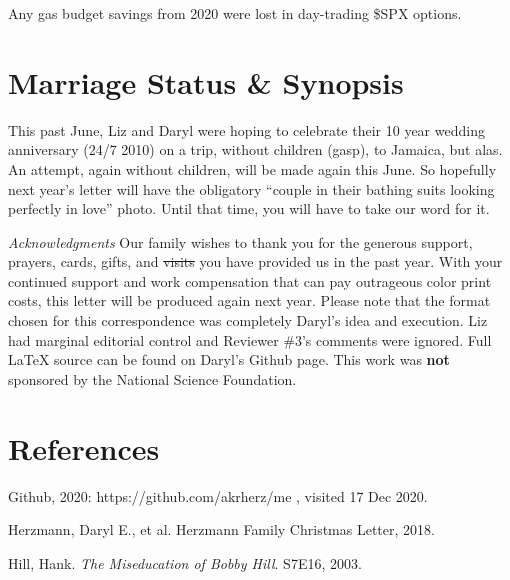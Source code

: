 \documentclass[letterpaper,11pt]{article}
\makeatletter
\def\refer{\par\noindent\hangindent\parindent\hangafter1}
\newenvironment{figurehere}
  {\def\@captype{figure}}
  {}
\makeatother
\begin{document}
\begin{multicols}{2}
\begin{figurehere}
    \centering   
    \caption{Any gas budget savings from 2020 were lost in day-trading \$SPX
    options.}
\end{figurehere}

\section{Marriage Status \& Synopsis}

This past June, Liz and Daryl were hoping
to celebrate their 10 year wedding anniversary (24/7 2010) on a trip,
without children (gasp), to Jamaica, but alas.  An attempt, again without
children, will be made again this June.  So hopefully next year's letter will have the
obligatory \enquote{couple in their bathing suits looking perfectly in love} photo.
Until that time, you will have to take our word for it.

\bigskip

\emph{Acknowledgments} Our family wishes to thank you for the generous 
support, prayers, cards, gifts, and \sout{visits} you have provided us in the past
year. With your continued support and work compensation that can pay outrageous 
color print costs, this letter will be produced again
next year. Please note that the format chosen for this
correspondence was completely Daryl's idea and execution. Liz had marginal
editorial control and Reviewer \#3's comments were ignored. Full \LaTeX\xspace source can be found on Daryl's Github
page.  This work was \textbf{not} sponsored by the National Science Foundation.

\section{References}

\refer Github, 2020: https://github.com/akrherz/me , visited 17 Dec 2020.
\refer Herzmann, Daryl E., et al. Herzmann Family Christmas Letter, 2018.
\refer Hill, Hank. \textit{The Miseducation of Bobby Hill}. S7E16, 2003.

\end{multicols}
\end{document}
